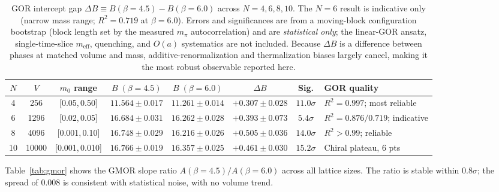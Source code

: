 \documentclass[12pt]{article}
\begin{document}
\begin{table}[ht]
\centering
\small
\caption{GOR intercept gap $\Delta B \equiv B(\beta{=}4.5)-B(\beta{=}6.0)$
across $N=4,6,8,10$. The $N=6$ result is indicative only (narrow mass
range; $R^2=0.719$ at $\beta=6.0$). Errors and significances are from a
moving-block configuration bootstrap (block length set by the measured
$m_\pi$ autocorrelation) and are \emph{statistical only}; the linear-GOR
ansatz, single-time-slice $m_{\text{eff}}$, quenching, and $O(a)$
systematics are not included. Because $\Delta B$ is a difference between
phases at matched volume and mass, additive-renormalization and
thermalization biases largely cancel, making it the most robust observable
reported here.}
\label{tab:deltab}
\setlength{\tabcolsep}{5pt}
\begin{tabular}{@{}c c c c c c c p{2.8cm}@{}}
  \toprule
  $N$ & $V$ & $m_0$ range
    & $B\;(\beta=4.5)$ & $B\;(\beta=6.0)$
    & $\Delta B$ & Sig. & GOR quality \\
  \midrule
  4  & 256   & [0.05,\,0.50]
     & $11.564\pm0.017$ & $11.261\pm0.014$
     & $+0.307\pm0.028$ & $11.0\sigma$
     & $R^2=0.997$; most reliable \\
  6  & 1296  & [0.02,\,0.05]
     & $16.684\pm0.031$ & $16.262\pm0.028$
     & $+0.393\pm0.073$ & $5.4\sigma$
     & $R^2=0.876/0.719$; indicative \\
  8  & 4096  & [0.001,\,0.10]
     & $16.748\pm0.029$ & $16.216\pm0.026$
     & $+0.505\pm0.036$ & $14.0\sigma$
     & $R^2>0.99$; reliable \\
  10 & 10000 & [0.001,\,0.010]
     & $16.766\pm0.019$ & $16.357\pm0.025$
     & $+0.461\pm0.030$ & $15.2\sigma$
     & Chiral plateau, 6 pts \\
  \bottomrule
\end{tabular}
\end{table}

Table~\ref{tab:gmor} shows the GMOR slope ratio
$A(\beta=4.5)/A(\beta=6.0)$ across all lattice sizes.  The ratio is
stable within $0.8\sigma$; the spread of 0.008 is consistent with
statistical noise, with no volume trend.
\end{document}
